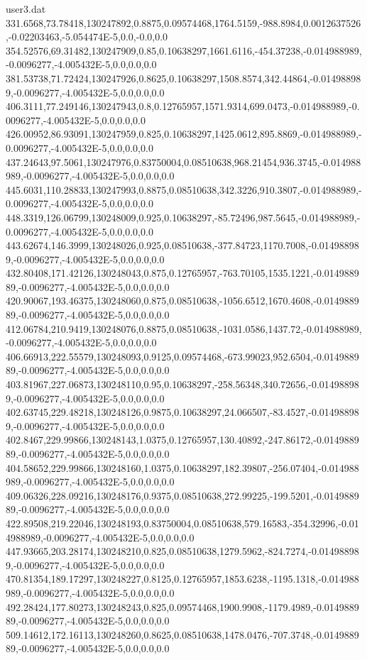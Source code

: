 \begin{filecontents}{user3.dat}
331.6568,73.78418,130247892,0.8875,0.09574468,1764.5159,-988.8984,0.0012637526,-0.02203463,-5.054474E-5,0.0,-0.0,0.0
354.52576,69.31482,130247909,0.85,0.10638297,1661.6116,-454.37238,-0.014988989,-0.0096277,-4.005432E-5,0.0,0.0,0.0
381.53738,71.72424,130247926,0.8625,0.10638297,1508.8574,342.44864,-0.014988989,-0.0096277,-4.005432E-5,0.0,0.0,0.0
406.3111,77.249146,130247943,0.8,0.12765957,1571.9314,699.0473,-0.014988989,-0.0096277,-4.005432E-5,0.0,0.0,0.0
426.00952,86.93091,130247959,0.825,0.10638297,1425.0612,895.8869,-0.014988989,-0.0096277,-4.005432E-5,0.0,0.0,0.0
437.24643,97.5061,130247976,0.83750004,0.08510638,968.21454,936.3745,-0.014988989,-0.0096277,-4.005432E-5,0.0,0.0,0.0
445.6031,110.28833,130247993,0.8875,0.08510638,342.3226,910.3807,-0.014988989,-0.0096277,-4.005432E-5,0.0,0.0,0.0
448.3319,126.06799,130248009,0.925,0.10638297,-85.72496,987.5645,-0.014988989,-0.0096277,-4.005432E-5,0.0,0.0,0.0
443.62674,146.3999,130248026,0.925,0.08510638,-377.84723,1170.7008,-0.014988989,-0.0096277,-4.005432E-5,0.0,0.0,0.0
432.80408,171.42126,130248043,0.875,0.12765957,-763.70105,1535.1221,-0.014988989,-0.0096277,-4.005432E-5,0.0,0.0,0.0
420.90067,193.46375,130248060,0.875,0.08510638,-1056.6512,1670.4608,-0.014988989,-0.0096277,-4.005432E-5,0.0,0.0,0.0
412.06784,210.9419,130248076,0.8875,0.08510638,-1031.0586,1437.72,-0.014988989,-0.0096277,-4.005432E-5,0.0,0.0,0.0
406.66913,222.55579,130248093,0.9125,0.09574468,-673.99023,952.6504,-0.014988989,-0.0096277,-4.005432E-5,0.0,0.0,0.0
403.81967,227.06873,130248110,0.95,0.10638297,-258.56348,340.72656,-0.014988989,-0.0096277,-4.005432E-5,0.0,0.0,0.0
402.63745,229.48218,130248126,0.9875,0.10638297,24.066507,-83.4527,-0.014988989,-0.0096277,-4.005432E-5,0.0,0.0,0.0
402.8467,229.99866,130248143,1.0375,0.12765957,130.40892,-247.86172,-0.014988989,-0.0096277,-4.005432E-5,0.0,0.0,0.0
404.58652,229.99866,130248160,1.0375,0.10638297,182.39807,-256.07404,-0.014988989,-0.0096277,-4.005432E-5,0.0,0.0,0.0
409.06326,228.09216,130248176,0.9375,0.08510638,272.99225,-199.5201,-0.014988989,-0.0096277,-4.005432E-5,0.0,0.0,0.0
422.89508,219.22046,130248193,0.83750004,0.08510638,579.16583,-354.32996,-0.014988989,-0.0096277,-4.005432E-5,0.0,0.0,0.0
447.93665,203.28174,130248210,0.825,0.08510638,1279.5962,-824.7274,-0.014988989,-0.0096277,-4.005432E-5,0.0,0.0,0.0
470.81354,189.17297,130248227,0.8125,0.12765957,1853.6238,-1195.1318,-0.014988989,-0.0096277,-4.005432E-5,0.0,0.0,0.0
492.28424,177.80273,130248243,0.825,0.09574468,1900.9908,-1179.4989,-0.014988989,-0.0096277,-4.005432E-5,0.0,0.0,0.0
509.14612,172.16113,130248260,0.8625,0.08510638,1478.0476,-707.3748,-0.014988989,-0.0096277,-4.005432E-5,0.0,0.0,0.0

\end{filecontents}
